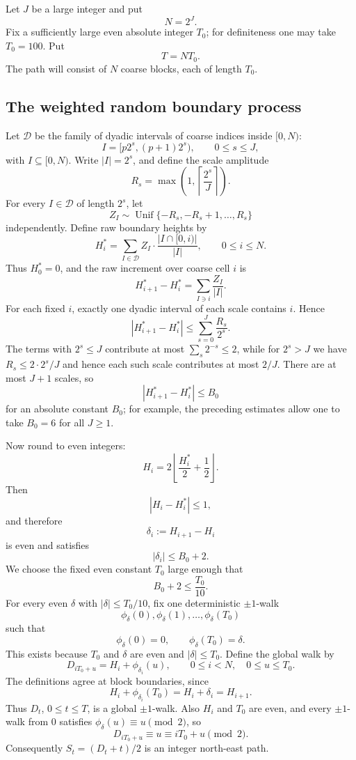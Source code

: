 \documentclass[10pt,a4paper]{amsart}
\newcommand{\1}{\mathbf 1}
\begin{document}
\bigskip
\noindent
Let $J$ be a large integer and put
\[
N=2^J.
\]
Fix a sufficiently large even absolute integer $T_0$; for definiteness one
may take $T_0=100$.  Put
\[
T=NT_0.
\]
The path will consist of $N$ coarse blocks, each of length $T_0$.

\subsection{The weighted random boundary process}

Let $\mathcal D$ be the family of dyadic intervals of coarse indices inside
$[0,N)$:
\[
I=[p2^s,(p+1)2^s),
\qquad 0\le s\le J,
\]
with $I\subseteq[0,N)$.  Write $|I|=2^s$, and define the scale amplitude
\[
R_s=\max\left(1,\left\lceil \frac{2^s}{J}\right\rceil\right).
\]
For every $I\in\mathcal D$ of length $2^s$, let
\[
Z_I\sim \operatorname{Unif}\{-R_s,-R_s+1,\ldots,R_s\}
\]
independently.  Define raw boundary heights by
\[
H_i^*=\sum_{I\in\mathcal D}Z_I\cdot\frac{|I\cap[0,i)|}{|I|},
\qquad 0\le i\le N.
\]
Thus $H_0^*=0$, and the raw increment over coarse cell $i$ is
\[
H_{i+1}^*-H_i^*=\sum_{I\ni i}\frac{Z_I}{|I|}.
\]
For each fixed $i$, exactly one dyadic interval of each scale contains
$i$.  Hence
\[
|H_{i+1}^*-H_i^*|
\le \sum_{s=0}^J \frac{R_s}{2^s}.
\]
The terms with $2^s\le J$ contribute at most $\sum_s 2^{-s}\le2$, while for $2^s>J$ we have $R_s\le 2\cdot 2^s/J$ and hence each such scale contributes at most $2/J$.  There are at most $J+1$ scales, so
\[
|H_{i+1}^*-H_i^*|\le B_0
\]
for an absolute constant $B_0$; for example, the preceding estimates allow one to take $B_0=6$ for all $J\ge1$.

\bigskip
\noindent
Now round to even integers:
\[
H_i=2\left\lfloor \frac{H_i^*}{2}+\frac12\right\rfloor.
\]
Then
\[
|H_i-H_i^*|\le1,
\]
and therefore
\[
\delta_i:=H_{i+1}-H_i
\]
is even and satisfies
\[
|\delta_i|\le B_0+2.
\]
We choose the fixed even constant $T_0$ large enough that
\[
B_0+2\le \frac{T_0}{10}.
\]
For every even $\delta$ with $|\delta|\le T_0/10$, fix one deterministic $\pm1$-walk
\[
\phi_\delta(0),\phi_\delta(1),\ldots,\phi_\delta(T_0)
\]
such that
\[
\phi_\delta(0)=0,
\qquad
\phi_\delta(T_0)=\delta.
\]
This exists because $T_0$ and $\delta$ are even and $|\delta|\le T_0$. Define the global walk by
\[
D_{iT_0+u}=H_i+\phi_{\delta_i}(u),
\qquad 0\le i<N,
\quad 0\le u\le T_0.
\]
The definitions agree at block boundaries, since
\[
H_i+\phi_{\delta_i}(T_0)=H_i+\delta_i=H_{i+1}.
\]
Thus $D_t$, $0\le t\le T$, is a global $\pm1$-walk.  Also $H_i$ and $T_0$ are even, and every $\pm1$-walk from $0$ satisfies $\phi_\delta(u)\equiv u\pmod2$, so
\[
D_{iT_0+u}\equiv u\equiv iT_0+u\pmod2.
\]
Consequently $S_t=(D_t+t)/2$ is an integer north-east path.
\end{document}
